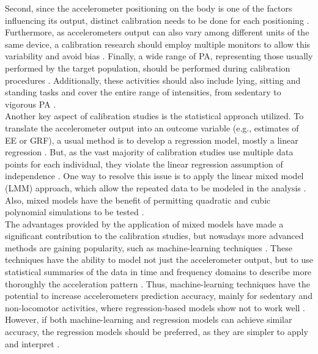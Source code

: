 \documentclass[11pt]{article}
\begin{document}
Second, since the accelerometer positioning on the body is one of the factors influencing its output, distinct calibration needs to be done for each positioning \cite{Welk_2005}. Furthermore, as accelerometers output can also vary among different units of the same device, a calibration research should employ multiple monitors to allow this variability and avoid bias \cite{Welk_2005}. Finally, a wide range of PA, representing those usually performed by the target population, should be performed during calibration procedures \cite{Welk_2005, Basset_2012}. Additionally, these activities should also include lying, sitting and standing tasks and cover the entire range of intensities, from sedentary to vigorous PA \cite{Basset_2012}. \\

Another key aspect of calibration studies is the statistical approach utilized. To translate the accelerometer output into an outcome variable (e.g., estimates of EE or GRF), a usual method is to develop a regression model, mostly a linear regression \cite{Montoye_2017}. But, as the vast majority of calibration studies use multiple data points for each individual, they violate the linear regression assumption of independence \cite{Welk_2005, Field_2012}. One way to resolve this issue is to apply the linear mixed model (LMM) approach, which allow the repeated data to be modeled in the analysis \cite{Field_2012}. Also, mixed models have the benefit of permitting quadratic and cubic polynomial simulations to be tested \cite{Field_2012}. \\

The advantages provided by the application of mixed models have made a significant contribution to the calibration studies, but nowadays more advanced methods are gaining popularity, such as machine-learning techniques \cite{Montoye_2017, Troiano_2014}. These techniques have the ability to model not just the accelerometer output, but to use statistical summaries of the data in time and frequency domains to describe more thoroughly the acceleration pattern \cite{Staudenmayer_2015, Farrahi_2019}. Thus, machine-learning techniques have the potential to increase accelerometers prediction accuracy, mainly for sedentary and non-locomotor activities, where regression-based models show not to work well \cite{Montoye_2017}. However, if both machine-learning and regression models can achieve similar accuracy, the regression models should be preferred, as they are simpler to apply and interpret \cite{Montoye_2017}. \\
\end{document}
